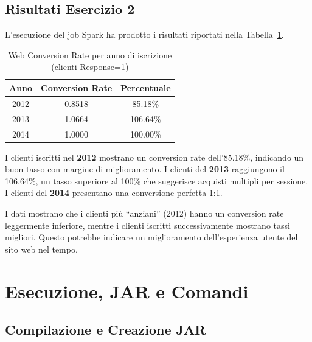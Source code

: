 \documentclass[a4paper, 12pt, oneside]{report}
\begin{document}
\section{Risultati Esercizio 2}

L'esecuzione del job Spark ha prodotto i risultati riportati nella Tabella~\ref{tab:risultati_spark}.

\begin{table}[H]
    \centering
    \begin{tabular}{|c|c|c|}
        \hline
        \textbf{Anno} & \textbf{Conversion Rate} & \textbf{Percentuale} \\
        \hline
        2012 & 0.8518 & 85.18\% \\
        \hline
        2013 & 1.0664 & 106.64\% \\
        \hline
        2014 & 1.0000 & 100.00\% \\
        \hline
    \end{tabular}
    \caption{Web Conversion Rate per anno di iscrizione (clienti Response=1)}
    \label{tab:risultati_spark}
\end{table}

I clienti iscritti nel \textbf{2012} mostrano un conversion rate dell'85.18\%, indicando un buon tasso con margine di miglioramento. I clienti del \textbf{2013} raggiungono il 106.64\%, un tasso superiore al 100\% che suggerisce acquisti multipli per sessione. I clienti del \textbf{2014} presentano una conversione perfetta 1:1.

\begin{tcolorbox}[colback=yellow!10,colframe=yellow!50!black,title=Nota]
I dati mostrano che i clienti pi\`u ``anziani'' (2012) hanno un conversion rate leggermente inferiore, mentre i clienti iscritti successivamente mostrano tassi migliori. Questo potrebbe indicare un miglioramento dell'esperienza utente del sito web nel tempo.
\end{tcolorbox}

\chapter{Esecuzione, JAR e Comandi}

\section{Compilazione e Creazione JAR}
\end{document}

